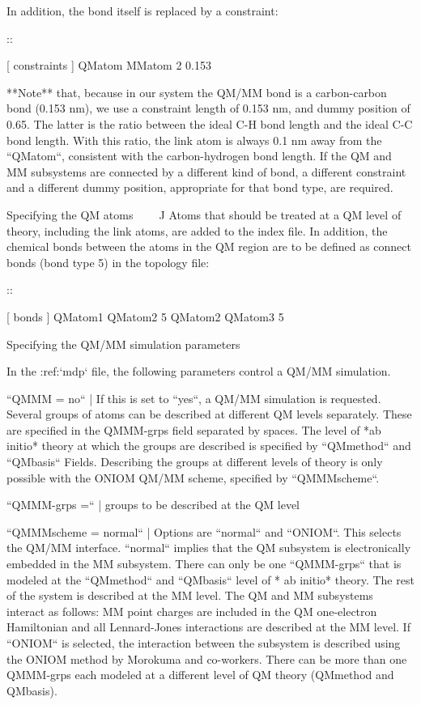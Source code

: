 In addition, the bond itself is replaced by a constraint:

::

    [ constraints ]
    QMatom MMatom 2 0.153

**Note** that, because in our system the QM/MM bond is a carbon-carbon
bond (0.153 nm), we use a constraint length of 0.153 nm, and dummy
position of 0.65. The latter is the ratio between the ideal C-H bond
length and the ideal C-C bond length. With this ratio, the link atom is
always 0.1 nm away from the ``QMatom``, consistent with the carbon-hydrogen
bond length. If the QM and MM subsystems are connected by a different
kind of bond, a different constraint and a different dummy position,
appropriate for that bond type, are required.

Specifying the QM atoms
^^^^^^^^^^^^^^^^^^^^^^^

Atoms that should be treated at a QM level of theory, including the link
atoms, are added to the index file. In addition, the chemical bonds
between the atoms in the QM region are to be defined as connect bonds
(bond type 5) in the topology file:

::

    [ bonds ]
    QMatom1 QMatom2 5
    QMatom2 QMatom3 5

Specifying the QM/MM simulation parameters
^^^^^^^^^^^^^^^^^^^^^^^^^^^^^^^^^^^^^^^^^^

In the :ref:`mdp` file, the following parameters control a
QM/MM simulation.

``QMMM = no``
    | If this is set to ``yes``, a QM/MM simulation is
      requested. Several groups of atoms can be described at different
      QM levels separately. These are specified in the QMMM-grps field
      separated by spaces. The level of *ab initio* theory at which the
      groups are described is specified by ``QMmethod`` and
      ``QMbasis`` Fields. Describing the groups at different
      levels of theory is only possible with the ONIOM QM/MM scheme,
      specified by ``QMMMscheme``.

``QMMM-grps =``
    | groups to be described at the QM level

``QMMMscheme = normal``
    | Options are ``normal`` and ``ONIOM``. This
      selects the QM/MM interface. ``normal`` implies that
      the QM subsystem is electronically embedded in the MM subsystem.
      There can only be one ``QMMM-grps`` that is modeled at
      the ``QMmethod`` and ``QMbasis`` level of
      * ab initio* theory. The rest of the system is described at the MM
      level. The QM and MM subsystems interact as follows: MM point
      charges are included in the QM one-electron Hamiltonian and all
      Lennard-Jones interactions are described at the MM level. If
      ``ONIOM`` is selected, the interaction between the
      subsystem is described using the ONIOM method by Morokuma and
      co-workers. There can be more than one QMMM-grps each modeled at a
      different level of QM theory (QMmethod and QMbasis).

